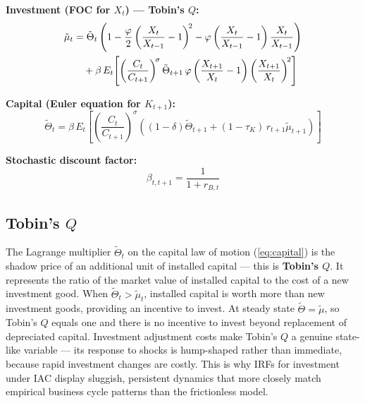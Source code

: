 \documentclass[11pt, a4paper]{article}
\begin{document}
\textbf{Investment (FOC for $X_t$) --- Tobin's $Q$:}
\begin{align}
    \tilde{\mu}_t
    &= \tilde{\Theta}_t
       \left(1 - \frac{\varphi}{2}\left(\frac{X_t}{X_{t-1}}-1\right)^{\!2}
             - \varphi\left(\frac{X_t}{X_{t-1}}-1\right)\frac{X_t}{X_{t-1}}
       \right) \notag \\
    &\quad
    + \beta\,E_t\!\left[
        \left(\frac{C_t}{C_{t+1}}\right)^{\!\sigma}
        \tilde{\Theta}_{t+1}\,\varphi
        \left(\frac{X_{t+1}}{X_t}-1\right)
        \left(\frac{X_{t+1}}{X_t}\right)^{\!2}
    \right]
    \label{eq:investment_foc}
\end{align}

\textbf{Capital (Euler equation for $K_{t+1}$):}
\begin{equation}
    \tilde{\Theta}_t
    = \beta\,E_t\!\left[
        \left(\frac{C_t}{C_{t+1}}\right)^{\!\sigma}
        \left((1-\delta)\tilde{\Theta}_{t+1} + (1-\tau_K)\,r_{t+1}\tilde{\mu}_{t+1}\right)
    \right]
    \label{eq:capital_euler}
\end{equation}

\textbf{Stochastic discount factor:}
\begin{equation}
    \beta_{t,t+1} = \frac{1}{1+r_{B,t}}
    \label{eq:sdf}
\end{equation}

\subsection*{Tobin's $Q$}

The Lagrange multiplier $\tilde{\Theta}_t$ on the capital law of motion
(\ref{eq:capital}) is the shadow price of an additional unit of installed
capital --- this is \textbf{Tobin's $Q$}. It represents the ratio of the market
value of installed capital to the cost of a new investment good. When
$\tilde{\Theta}_t > \tilde{\mu}_t$, installed capital is worth more than new
investment goods, providing an incentive to invest. At steady state
$\tilde{\Theta} = \tilde{\mu}$, so Tobin's $Q$ equals one and there is no
incentive to invest beyond replacement of depreciated capital. Investment
adjustment costs make Tobin's $Q$ a genuine state-like variable --- its response
to shocks is hump-shaped rather than immediate, because rapid investment changes
are costly. This is why IRFs for investment under IAC display sluggish, persistent
dynamics that more closely match empirical business cycle patterns than the
frictionless model.

\end{document}
